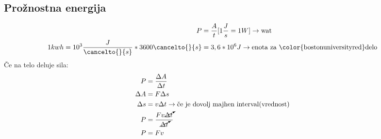 {\color{indiagreen}\subsection{Prožnostna energija}}
\begin{align*}
	P &= \frac{A}{t}[1\frac{J}{s} = 1W] \rightarrow \text{wat}\\
	1kwh = 10^3 \frac{J}{\cancelto{}{s}} * 3600\cancelto{}{s}&= 3,6*10^6 J \rightarrow \text{enota za {\color{bostonuniversityred}delo}}\\ 
\end{align*}
Če na telo deluje sila:\\
\begin{align*}
	P &= \frac{\Delta A}{\Delta t}\\
	\Delta A &= F\Delta s\\
	\Delta s &= v\Delta t \rightarrow \text{če je dovolj majhen interval(vrednost)}\\
	P &= \frac{Fv\cancelto{}{\Delta t}}{\cancelto{}{\Delta t}}\\
	P &= Fv\\
\end{align*}

